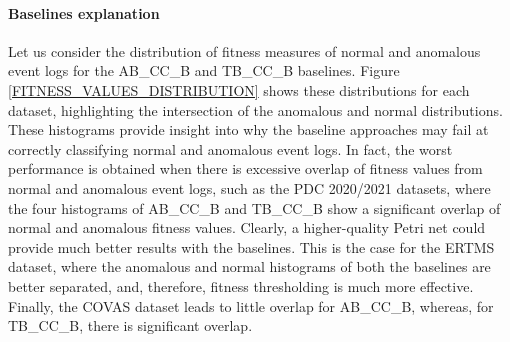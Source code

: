 \paragraph{Baselines explanation} Let us consider the distribution of fitness measures of normal and anomalous event logs for the AB\_CC\_B and TB\_CC\_B baselines. Figure \ref{FITNESS_VALUES_DISTRIBUTION} shows these distributions for each dataset, highlighting the intersection of the anomalous and normal distributions. These histograms provide insight into why the baseline approaches may fail at correctly classifying normal and anomalous event logs. In fact, the worst performance is obtained when there is excessive overlap of fitness values from normal and anomalous event logs, such as the PDC 2020/2021 datasets, where the four histograms of AB\_CC\_B and TB\_CC\_B show a significant overlap of normal and anomalous fitness values. Clearly, a higher-quality Petri net could provide much better results with the baselines. This is the case for the ERTMS dataset, where the anomalous and normal histograms of both the baselines are better separated, and, therefore, fitness thresholding is much more effective. Finally, the COVAS dataset leads to little overlap for AB\_CC\_B, whereas, for TB\_CC\_B, there is significant overlap. 
